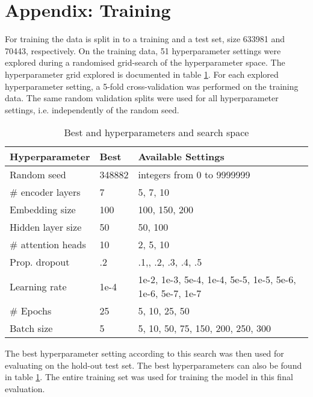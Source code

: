 \documentclass[a4paper]{article}
\begin{document}
\section{Appendix: Training}

For training the data is split in to a training and a test set, size 633981 and 70443, respectively. On the training data, 51 hyperparameter settings were explored during a randomised grid-search of the hyperparameter space. The hyperparameter grid explored is documented in table \ref{tab:hyperparameter_space}. For each explored hyperparameter setting, a 5-fold cross-validation was performed on the training data. The same random validation splits were used for all hyperparameter settings, i.e. independently of the random seed.

\begin{table}[]
    \centering
    \begin{tabular}{lll}
       Hyperparameter  & Best & Available Settings  \\ \hline
       Random seed & 348882 &  integers from 0 to 9999999 \\
       \# encoder layers & 7 & 5, 7, 10 \\
       Embedding size & 100 & 100, 150, 200 \\
       Hidden layer size & 50 & 50, 100 \\
       \# attention heads & 10 & 2, 5, 10 \\
       Prop. dropout & .2 & .1,, .2, .3, .4, .5 \\
       Learning rate & 1e-4 &  1e-2, 1e-3, 5e-4, 1e-4, 5e-5, 1e-5, 5e-6, 1e-6, 5e-7, 1e-7 \\
       \# Epochs & 25 & 5, 10, 25, 50 \\
       Batch size & 5 & 5, 10, 50, 75, 150, 200, 250, 300 \\
    \end{tabular}
    \caption{Best and hyperparameters and search space}
    \label{tab:hyperparameter_space}
\end{table}

The best hyperparameter setting according to this search was then used for evaluating on the hold-out test set. The best hyperparameters can also be found in table \ref{tab:hyperparameter_space}. The entire training set was used for training the model in this final evaluation.
\end{document}
